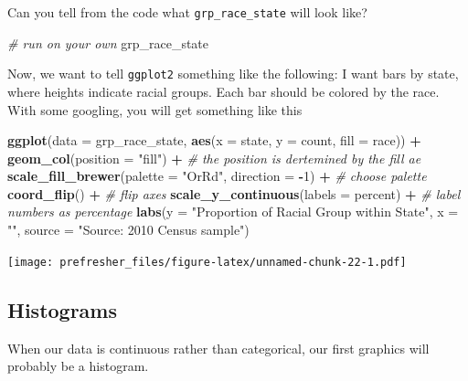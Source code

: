 \documentclass[]{book}
\newenvironment{Shaded}{\begin{snugshade}}{\end{snugshade}}
\newcommand{\KeywordTok}[1]{\textcolor[rgb]{0.13,0.29,0.53}{\textbf{#1}}}
\newcommand{\DataTypeTok}[1]{\textcolor[rgb]{0.13,0.29,0.53}{#1}}
\newcommand{\DecValTok}[1]{\textcolor[rgb]{0.00,0.00,0.81}{#1}}
\newcommand{\StringTok}[1]{\textcolor[rgb]{0.31,0.60,0.02}{#1}}
\newcommand{\CommentTok}[1]{\textcolor[rgb]{0.56,0.35,0.01}{\textit{#1}}}
\newcommand{\OperatorTok}[1]{\textcolor[rgb]{0.81,0.36,0.00}{\textbf{#1}}}
\newcommand{\NormalTok}[1]{#1}
\theoremstyle{definition}
\theoremstyle{definition}
\theoremstyle{definition}
\theoremstyle{remark}
\begin{document}
Can you tell from the code what \texttt{grp\_race\_state} will look
like?

\begin{Shaded}
\begin{Highlighting}[]
\CommentTok{# run on your own}
\NormalTok{grp_race_state}
\end{Highlighting}
\end{Shaded}

Now, we want to tell \texttt{ggplot2} something like the following: I
want bars by state, where heights indicate racial groups. Each bar
should be colored by the race. With some googling, you will get
something like this

\begin{Shaded}
\begin{Highlighting}[]
\KeywordTok{ggplot}\NormalTok{(}\DataTypeTok{data =}\NormalTok{ grp_race_state, }\KeywordTok{aes}\NormalTok{(}\DataTypeTok{x =}\NormalTok{ state, }\DataTypeTok{y =}\NormalTok{ count,  }\DataTypeTok{fill =}\NormalTok{ race)) }\OperatorTok{+}
\StringTok{  }\KeywordTok{geom_col}\NormalTok{(}\DataTypeTok{position =} \StringTok{"fill"}\NormalTok{) }\OperatorTok{+}\StringTok{ }\CommentTok{# the position is dertemined by the fill ae}
\StringTok{  }\KeywordTok{scale_fill_brewer}\NormalTok{(}\DataTypeTok{palette =} \StringTok{"OrRd"}\NormalTok{, }\DataTypeTok{direction =} \OperatorTok{-}\DecValTok{1}\NormalTok{) }\OperatorTok{+}\StringTok{ }\CommentTok{# choose palette}
\StringTok{  }\KeywordTok{coord_flip}\NormalTok{() }\OperatorTok{+}\StringTok{ }\CommentTok{# flip axes}
\StringTok{  }\KeywordTok{scale_y_continuous}\NormalTok{(}\DataTypeTok{labels =}\NormalTok{ percent) }\OperatorTok{+}\StringTok{ }\CommentTok{# label numbers as percentage}
\StringTok{  }\KeywordTok{labs}\NormalTok{(}\DataTypeTok{y =} \StringTok{"Proportion of Racial Group within State"}\NormalTok{,}
       \DataTypeTok{x =} \StringTok{""}\NormalTok{,}
       \DataTypeTok{source =} \StringTok{"Source: 2010 Census  sample"}\NormalTok{)}
\end{Highlighting}
\end{Shaded}

\texttt{[image: prefresher\_files/figure-latex/unnamed-chunk-22-1.pdf]}

\subsection{Histograms}\label{histograms}

When our data is continuous rather than categorical, our first graphics
will probably be a histogram.
\end{document}
